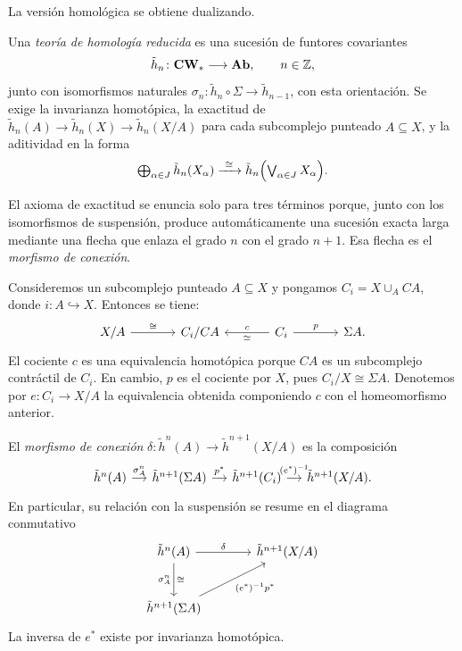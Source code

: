 La versión homológica se obtiene dualizando.

\begin{defi}\label{defi:homologia-reducida}
Una \emph{teoría de homología reducida} es una sucesión de funtores covariantes
\[
\tilde h_n\colon\mathbf{CW}_*\longrightarrow\mathbf{Ab},
\qquad n\in\mathbb Z,
\]
junto con isomorfismos naturales $\sigma_n\colon\tilde h_n\circ\Sigma\to\tilde h_{n-1}$, con esta orientación. Se exige la invarianza homotópica, la exactitud de $\tilde h_n(A)\to\tilde h_n(X)\to\tilde h_n(X/A)$ para cada subcomplejo punteado $A\subseteq X$, y la aditividad en la forma
\[\textstyle
\bigoplus_{\alpha\in J}\tilde h_n(X_\alpha)\xrightarrow{\ \cong\ }\tilde h_n\Bigl(\bigvee_{\alpha\in J}X_\alpha\Bigr).
\]
\end{defi}


El axioma de exactitud se enuncia solo para tres términos porque, junto con los isomorfismos de suspensión, produce automáticamente una sucesión exacta larga mediante una flecha que enlaza el grado $n$ con el grado $n+1$. Esa flecha es el \emph{morfismo de conexión}.

Consideremos un subcomplejo punteado $A\subseteq X$ y pongamos $C_i=X\cup_A CA$, donde $i\colon A\hookrightarrow X$. Entonces se tiene:
\[
\begin{tikzcd}[column sep=large]
X/A \arrow[r,"\cong"] & C_i/CA & C_i \arrow[l,"c"',"\simeq"] \arrow[r,"p"] & \Sigma A.
\end{tikzcd}
\]
El cociente $c$ es una equivalencia homotópica porque $CA$ es un subcomplejo contráctil de $C_i$. En cambio, $p$ es el cociente por $X$, pues $C_i/X\cong\Sigma A$. Denotemos por $e\colon C_i\to X/A$ la equivalencia obtenida componiendo $c$ con el homeomorfismo anterior.

\begin{defi}\label{defi:conexion}
El \emph{morfismo de conexión} $\delta\colon\tilde h^n(A)\to\tilde h^{n+1}(X/A)$ es la composición
\[
\begin{tikzcd}[column sep=small]
\tilde h^n(A) \arrow[r,"\sigma^n_A"] & \tilde h^{n+1}(\Sigma A) \arrow[r,"p^*"] & \tilde h^{n+1}(C_i) \arrow[r,"(e^*)^{-1}"] & \tilde h^{n+1}(X/A).
\end{tikzcd}
\]
En particular, su relación con la suspensión se resume en el diagrama conmutativo
\[
\begin{tikzcd}[column sep=large,row sep=large]
\tilde h^n(A) \arrow[r,"\delta"] \arrow[d,"\sigma^n_A"',"\cong"] & \tilde h^{n+1}(X/A)\\
\tilde h^{n+1}(\Sigma A) \arrow[ur,"{(e^*)^{-1}p^*}"'] &
\end{tikzcd}
\]
La inversa de $e^*$ existe por invarianza homotópica.
\end{defi}

